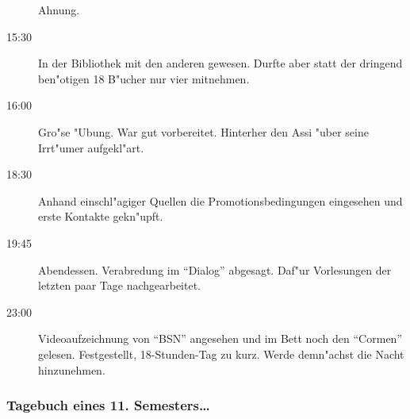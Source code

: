 \begin{description}
Ahnung.
\item[15:30] In der Bibliothek mit den anderen gewesen. Durfte aber statt der
dringend ben"otigen 18 B"ucher nur vier mitnehmen.
\item[16:00] Gro"se "Ubung. War gut vorbereitet. Hinterher den Assi "uber seine
Irrt"umer aufgekl"art.
\item[18:30] Anhand einschl"agiger Quellen die Promotionsbedingungen eingesehen und
erste Kontakte gekn"upft.
\item[19:45] Abendessen. Verabredung im "`Dialog"' abgesagt. Daf"ur Vorlesungen
der letzten paar Tage nachgearbeitet.
\item[23:00] Videoaufzeichnung von "`BSN"' angesehen und im Bett noch den "`Cormen"'
gelesen. Festgestellt, 18-Stunden-Tag zu kurz. Werde demn"achst die Nacht
hinzunehmen.
\end{description}

\subsubsection{Tagebuch eines 11. Semesters\ldots}


